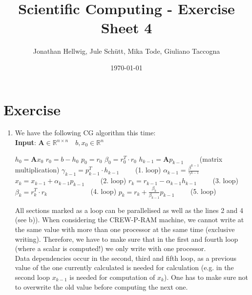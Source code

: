 \documentclass{article}
\title{Scientific Computing - Exercise Sheet 4}
\author{Jonathan Hellwig, Jule Schütt, Mika Tode, Giuliano Taccogna}
\date{\today}
\begin{document}
\maketitle

\section{Exercise}
\begin{enumerate}[label=(\alph*)]
\item We have the following CG algorithm this time:\\

   \textbf{Input}: $ \textbf{A} \in \mathbb{R}^{n\times n} \quad b, x_0\in \mathbb{R}^n$
    \begin{algorithmic}[1]
	\State $h_{0} = \textbf{A}x_{0}$ 
	\State $r_0 = b - h_0$
	\State $p_0 = r_0$
	\State $\beta_0 = r_0^T\cdot r_0$
	\State $h_{k-1} = \textbf{A}p_{k-1}\qquad$ (matrix multiplication)
	\State $\gamma_{k-1} = p^{T}_{k-1}\cdot h_{k-1}\qquad$ (1. loop)
	\State $\alpha_{k-1} = \frac{\beta^{k-1}}{\gamma^{k-1}}$
	\State $x_k = x_{k-1} + \alpha_{k-1}p_{k-1}\qquad$ (2. loop)
	\State $r_k = r_{k-1} - \alpha_{k-1}h_{k-1}\qquad$ (3. loop)
	\State $\beta_k = r_k^T\cdot r_k\qquad \qquad \qquad$ (4. loop)
	\State $p_k = r_{k} + \frac{\beta_k}{\beta_{k-1}}p_{k-1}\qquad$ (5. loop)
	\EndFor
    \end{algorithmic}
All sections marked as a loop can be parallelised as well as the lines 2 and 4 (see b)). When considering the CREW-P-RAM machine, we cannot write at the same value with more than one processor at the same time (exclusive writing). Therefore, we have to make sure that in the first and fourth loop (where a scalar is computed!) we only write with one processor.\\
Data dependencies occur in the second, third and fifth loop, as a previous value of the one currently calculated is needed for calculation (e.g. in the second loop $x_{k-1}$ is needed for computation of $x_k$). One has to make sure not to overwrite the old value before computing the next one.




\end{enumerate}
\end{document}

